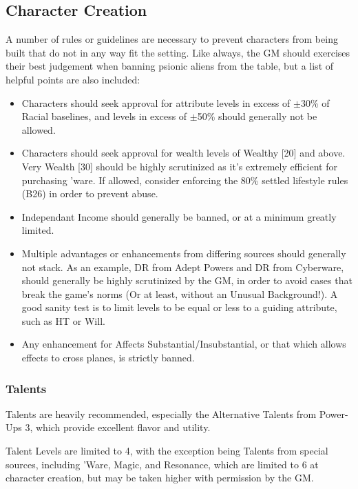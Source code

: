 \begin{multicols*}{3}
	\subsection{Character Creation}
	
	A number of rules or guidelines are necessary to prevent characters from being built that do not in any way fit the setting. Like always, the GM should exercises their best judgement when banning psionic aliens from the table, but a list of helpful points are also included:
	
	\begin{itemize}
		\itemsep 0pt
		\item Characters should seek approval for attribute levels in excess of \(\pm\)30\% of Racial baselines, and levels in excess of \(\pm\)50\% should generally not be allowed.
		\item Characters should seek approval for wealth levels of Wealthy [20] and above. Very Wealth [30] should be highly scrutinized as it's extremely efficient for purchasing 'ware. If allowed, consider enforcing the 80\% settled lifestyle rules (B26) in order to prevent abuse.
		\item Independant Income should generally be banned, or at a minimum greatly limited.
		\item Multiple advantages or enhancements from differing sources should generally not stack. As an example, DR from Adept Powers and DR from Cyberware, should generally be highly scrutinized by the GM, in order to avoid cases that break the game's norms (Or at least, without an Unusual Background!). A good sanity test is to limit levels to be equal or less to a guiding attribute, such as HT or Will.
		\item Any enhancement for Affects Substantial/Insubstantial, or that which allows effects to cross planes, is strictly banned.
	\end{itemize}
	
	\subsubsection{Talents}
	
	Talents are heavily recommended, especially the Alternative Talents from Power-Ups 3, which provide excellent flavor and utility. 
	
	Talent Levels are limited to 4, with the exception being Talents from special sources, including 'Ware, Magic, and Resonance, which are limited to 6 at character creation, but may be taken higher with permission by the GM.
	

\end{multicols*}
